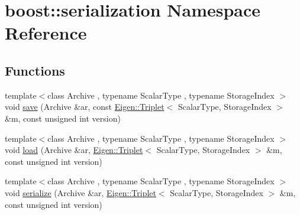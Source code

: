 \hypertarget{namespaceboost_1_1serialization}{\section{boost\-:\-:serialization Namespace Reference}
\label{namespaceboost_1_1serialization}
}
\subsection*{Functions}
\begin{DoxyCompactItemize}
\item 
{\footnotesize template$<$class Archive , typename Scalar\-Type , typename Storage\-Index $>$ }\\void \hyperlink{namespaceboost_1_1serialization_abcc2aa85c9dda8ff1cbf03aa776e62df}{save} (Archive \&ar, const \hyperlink{class_eigen_1_1_triplet}{Eigen\-::\-Triplet}$<$ Scalar\-Type, Storage\-Index $>$ \&m, const unsigned int version)
\item 
{\footnotesize template$<$class Archive , typename Scalar\-Type , typename Storage\-Index $>$ }\\void \hyperlink{namespaceboost_1_1serialization_a8f892ce6889c6f42eb5101e81d3640c7}{load} (Archive \&ar, \hyperlink{class_eigen_1_1_triplet}{Eigen\-::\-Triplet}$<$ Scalar\-Type, Storage\-Index $>$ \&m, const unsigned int version)
\item 
{\footnotesize template$<$class Archive , typename Scalar\-Type , typename Storage\-Index $>$ }\\void \hyperlink{namespaceboost_1_1serialization_a0378c8e5d95dfd58f2615afcba055125}{serialize} (Archive \&ar, \hyperlink{class_eigen_1_1_triplet}{Eigen\-::\-Triplet}$<$ Scalar\-Type, Storage\-Index $>$ \&m, const unsigned int version)
\end{DoxyCompactItemize}


